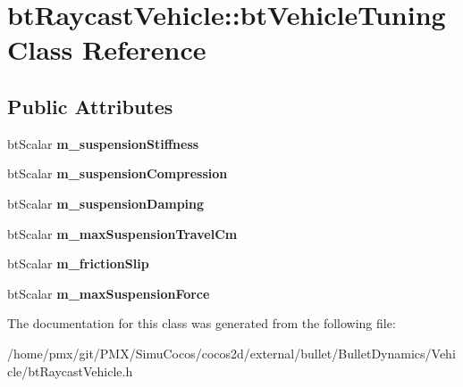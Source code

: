 \hypertarget{classbtRaycastVehicle_1_1btVehicleTuning}{}\section{bt\+Raycast\+Vehicle\+:\+:bt\+Vehicle\+Tuning Class Reference}
\label{classbtRaycastVehicle_1_1btVehicleTuning}
\subsection*{Public Attributes}
\begin{DoxyCompactItemize}
\item 
\mbox{\label{classbtRaycastVehicle_1_1btVehicleTuning_a95560af1a353c41a311441bcf0c0dd38}} 
bt\+Scalar {\bfseries m\+\_\+suspension\+Stiffness}
\item 
\mbox{\label{classbtRaycastVehicle_1_1btVehicleTuning_af8b5697271ca760bcb8cd2ab9fd42c8e}} 
bt\+Scalar {\bfseries m\+\_\+suspension\+Compression}
\item 
\mbox{\label{classbtRaycastVehicle_1_1btVehicleTuning_ac7c48576a8b149379d9c6c004728c1e6}} 
bt\+Scalar {\bfseries m\+\_\+suspension\+Damping}
\item 
\mbox{\label{classbtRaycastVehicle_1_1btVehicleTuning_a789f463dd10e87e5b99d3eaffbcf3de5}} 
bt\+Scalar {\bfseries m\+\_\+max\+Suspension\+Travel\+Cm}
\item 
\mbox{\label{classbtRaycastVehicle_1_1btVehicleTuning_a10be267c88447f74f0333e0191afb9f3}} 
bt\+Scalar {\bfseries m\+\_\+friction\+Slip}
\item 
\mbox{\label{classbtRaycastVehicle_1_1btVehicleTuning_a9a0b62ea981354a0de93912e776f2487}} 
bt\+Scalar {\bfseries m\+\_\+max\+Suspension\+Force}
\end{DoxyCompactItemize}


The documentation for this class was generated from the following file\+:\begin{DoxyCompactItemize}
\item 
/home/pmx/git/\+P\+M\+X/\+Simu\+Cocos/cocos2d/external/bullet/\+Bullet\+Dynamics/\+Vehicle/bt\+Raycast\+Vehicle.\+h\end{DoxyCompactItemize}
